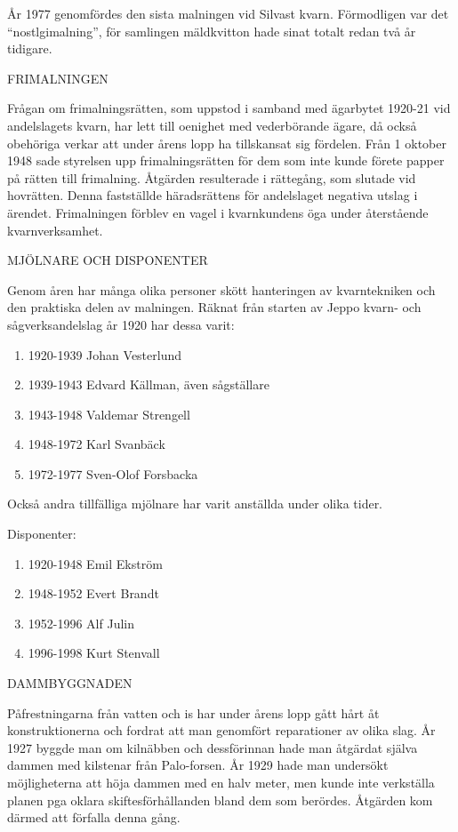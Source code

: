År 1977 genomfördes den sista malningen vid Silvast kvarn. Förmodligen var det ``nostlgimalning'', för samlingen mäldkvitton hade sinat totalt redan två år tidigare.


FRIMALNINGEN

Frågan om frimalningsrätten, som uppstod i samband med ägarbytet 1920-21 vid andelslagets kvarn, har lett till oenighet med vederbörande ägare, då också obehöriga verkar att under årens lopp ha tillskansat sig fördelen. Från 1 oktober 1948 sade styrelsen upp frimalningsrätten för dem som inte kunde förete papper på rätten till frimalning. Åtgärden resulterade i rättegång, som slutade vid hovrätten. Denna fastställde häradsrättens för andelslaget negativa utslag i ärendet. Frimalningen förblev en vagel i kvarnkundens öga under återstående kvarnverksamhet.


MJÖLNARE OCH DISPONENTER

Genom åren har många olika personer skött hanteringen av kvarntekniken och den praktiska delen av malningen. Räknat från starten av Jeppo kvarn- och sågverksandelslag år 1920 har dessa varit:
\begin{enumerate}
  \item 1920-1939		Johan Vesterlund
  \item 1939-1943		Edvard Källman, även sågställare
  \item 1943-1948		Valdemar Strengell
  \item 1948-1972		Karl Svanbäck
  \item 1972-1977		Sven-Olof Forsbacka
\end{enumerate}

Också andra tillfälliga mjölnare har varit anställda under olika tider.

Disponenter:
\begin{enumerate}
  \item 1920-1948		Emil Ekström
  \item 1948-1952		Evert Brandt
  \item 1952-1996		Alf Julin
  \item 1996-1998	  Kurt Stenvall
\end{enumerate}


DAMMBYGGNADEN

Påfrestningarna från vatten och is har under årens lopp gått hårt åt konstruktionerna och fordrat att man genomfört reparationer av olika slag. År 1927 byggde man om kilnäbben och dessförinnan hade man åtgärdat själva dammen med kilstenar från Palo-forsen. År 1929 hade man undersökt möjligheterna att höja dammen med en halv meter, men kunde inte verkställa planen pga oklara skiftesförhållanden bland dem som berördes. Åtgärden kom därmed att förfalla denna gång.

